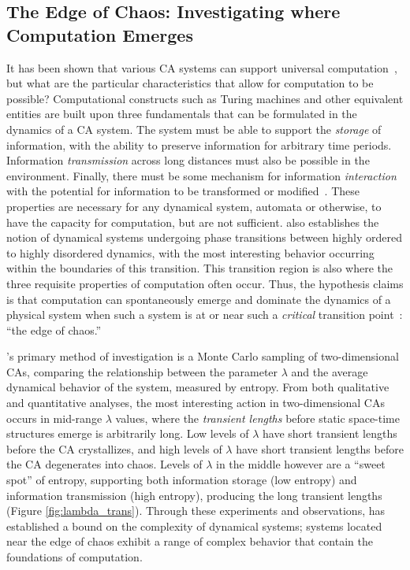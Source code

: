 \documentclass[a4paper,11pt]{article}
\begin{document}


\subsection{The Edge of Chaos: Investigating where Computation Emerges}
\label{subsec:edge_chaos}

It has been shown that various CA systems can support universal computation~\cite{wf86}, but what are the particular characteristics that allow for computation to be possible? Computational constructs such as Turing machines and other equivalent entities are built upon three fundamentals that can be formulated in the dynamics of a CA system. The system must be able to support the \textit{storage} of information, with the ability to preserve information for arbitrary time periods. Information \textit{transmission} across long distances must also be possible in the environment. Finally, there must be some mechanism for information \textit{interaction} with the potential for information to be transformed or modified~\cite{la90}. These properties are necessary for any dynamical system, automata or otherwise, to have the capacity for computation, but are not sufficient. \citeauthor{la90} also establishes the notion of dynamical systems undergoing phase transitions between highly ordered to highly disordered dynamics, with the most interesting behavior occurring within the boundaries of this transition. This transition region is also where the three requisite properties of computation often occur. Thus, the hypothesis \citeauthor{la90} claims is that computation can spontaneously emerge and dominate the dynamics of a physical system when such a system is at or near such a \textit{critical} transition point~\cite{la90}: ``the edge of chaos.''

\citeauthor{la90}'s primary method of investigation is a Monte Carlo sampling of two-dimensional CAs, comparing the relationship between the parameter $\lambda$ and the average dynamical behavior of the system, measured by entropy. From both qualitative and quantitative analyses, the most interesting action in two-dimensional CAs occurs in mid-range $\lambda$ values, where the \textit{transient lengths} before static space-time structures emerge is arbitrarily long. Low levels of $\lambda$ have short transient lengths before the CA crystallizes, and high levels of $\lambda$ have short transient lengths before the CA degenerates into chaos. Levels of $\lambda$ in the middle however are a ``sweet spot'' of entropy, supporting both information storage (low entropy) and information transmission (high entropy), producing the long transient lengths (Figure \ref{fig:lambda_trans}).
Through these experiments and observations, \citeauthor{la90} has established a bound on the complexity of dynamical systems; systems located near the edge of chaos exhibit a range of complex behavior that contain the foundations of computation.
\end{document}
